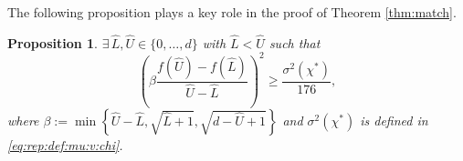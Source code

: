 \documentclass[onecolumn,letterpaper]{IEEEtran}
\newtheorem{proposition}{Proposition}
\newcommand{\plsize}{{\chi}}
\newcommand{\var}{{\sigma^{2}}}
\newcommand{\lwm}{{\hat{L}}}
\newcommand{\upm}{{\hat{U}}}
\newcommand{\bet}{{\beta}}
\begin{document}
The following proposition plays a key role in the proof of Theorem \ref{thm:match}.
\begin{proposition} \label{prop:match}
$\exists\, \lwm,\upm \in \{0,\dots,  d\}$ with $\lwm<\upm$ such that 
\begin{equation}
\label{eq:math:key-equation}
  \left(  \bet \frac{f(\upm)-f(\lwm)}{\upm-\lwm} \right)^2 \geq \frac{\var(\plsize^{*})}{176},
\end{equation}
where $\bet := \min \left\{ \upm-\lwm , \sqrt{\lwm+1} , \sqrt{d-\upm+1} \right\}$ and $\var(\plsize^{*})$ is defined in \eqref{eq:rep:def:mu:v:chi}.
\end{proposition}
\end{document}
